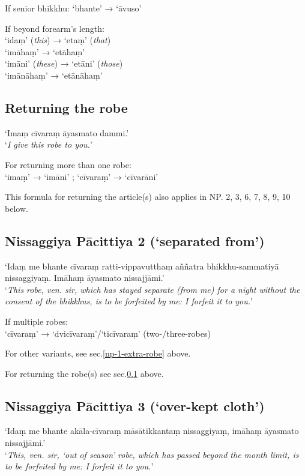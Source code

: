 If senior bhikkhu: ‘bhante’ → ‘āvuso’

If beyond forearm's length:\\
‘idaṃ’ (\emph{this}) → ‘etaṃ’ (\emph{that})\\
‘imāhaṃ’ → ‘etāhaṃ’\\
‘imāni’ (\emph{these}) → ‘etāni’ (\emph{those})\\
‘imānāhaṃ’ → ‘etānāhaṃ’

\subsection{Returning the robe}
\label{np-1-returning-the-robe}

‘Imaṃ cīvaraṃ āyasmato dammi.’\\
‘\emph{I give this robe to you.}’


For returning more than one robe:\\
‘imaṃ’ → ‘imāni’ ; ‘cīvaraṃ’ → ‘cīvarāni’

This formula for returning the article(s) also applies in NP. 2, 3, 6, 7, 8, 9,
10 below.

\subsection{Nissaggiya Pācittiya 2 (‘separated from’)}

‘Idaṃ me bhante cīvaraṃ ratti-vippavutthaṃ aññatra bhikkhu-sammatiyā
nissaggiyaṃ. Imāhaṃ āyasmato nissajjāmi.’\\
‘\emph{This robe, ven. sir, which has stayed separate (from me) for a night
  without the consent of the bhikkhus, is to be forfeited by me: I forfeit it to
  you.}’


If multiple robes:\\
‘cīvaraṃ’ → ‘dvicīvaraṃ’/‘ticīvaraṃ’ (two-/three-robes)

For other variants, see sec.\ref{np-1-extra-robe} above.

For returning the robe(s) see sec.\ref{np-1-returning-the-robe} above.
 
\subsection{Nissaggiya Pācittiya 3 (‘over-kept cloth’)}

‘Idaṃ me bhante akāla-cīvaraṃ māsātikkantaṃ nissaggiyaṃ, imāhaṃ āyasmato nissajjāmi.’\\
‘\emph{This, ven. sir, ‘out of season’ robe, which has passed beyond the month
  limit, is to be forfeited by me: I forfeit it to you.}’

